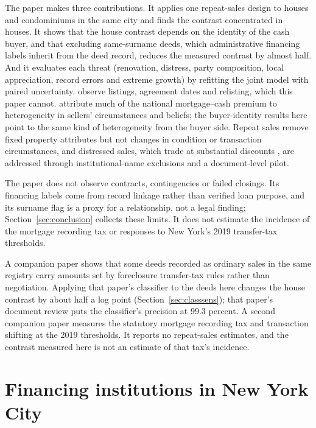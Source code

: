 \documentclass[12pt]{article}
\begin{document}
The paper makes three contributions. It applies one repeat-sales design to houses and condominiums in the same city and finds the contrast concentrated in houses. It shows that the house contrast depends on the identity of the cash buyer, and that excluding same-surname deeds, which administrative financing labels inherit from the deed record, reduces the measured contrast by almost half. And it evaluates each threat (renovation, distress, party composition, local appreciation, record errors and extreme growth) by refitting the joint model with paired uncertainty. \citet{hanhong2024} observe listings, agreement dates and relisting, which this paper cannot. \citet{reher2024} attribute much of the national mortgage--cash premium to heterogeneity in sellers' circumstances and beliefs; the buyer-identity results here point to the same kind of heterogeneity from the buyer side. Repeat sales remove fixed property attributes \citep{bailey1963} but not changes in condition or transaction circumstances, and distressed sales, which trade at substantial discounts \citep{campbell2011}, are addressed through institutional-name exclusions and a document-level pilot.

The paper does not observe contracts, contingencies or failed closings. Its financing labels come from record linkage rather than verified loan purpose, and its surname flag is a proxy for a relationship, not a legal finding; Section~\ref{sec:conclusion} collects these limits. It does not estimate the incidence of the mortgage recording tax or responses to New York's 2019 transfer-tax thresholds.

A companion paper \citep{loschi2026deed} shows that some deeds recorded as ordinary sales in the same registry carry amounts set by foreclosure transfer-tax rules rather than negotiation. Applying that paper's classifier to the deeds here changes the house contrast by about half a log point (Section~\ref{sec:classsens}); that paper's document review puts the classifier's precision at 99.3 percent. A second companion paper \citep{loschi2026shape} measures the statutory mortgage recording tax and transaction shifting at the 2019 thresholds. It reports no repeat-sales estimates, and the contrast measured here is not an estimate of that tax's incidence.

\section{Financing institutions in New York City}
\end{document}

